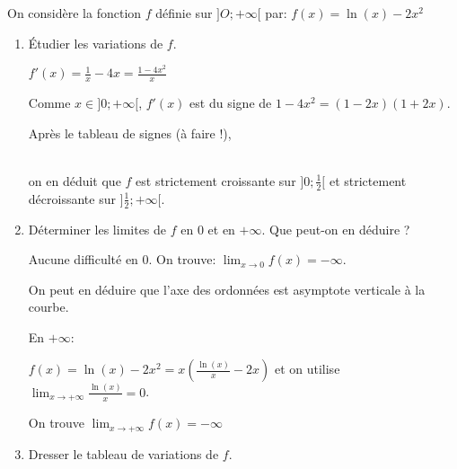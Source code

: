 \documentclass{cornouaille}
\begin{document}
\begin{exercice}[Logarithmes][7]
On considère la fonction $f$ définie sur $]O;+\infty[$ par: $f(x) = \ln(x)-2x^2$
\begin{enumerate}
	\item \'Etudier les variations de $f$.\\
	\ldotcarreaux[5]
\begin{solution}
$f'(x)=\frac{1}{x}-4x=\frac{1-4x^2}{x}$

Comme $x \in ]0;+\infty[$, $f'(x)$ est du signe de $1-4x^2=(1-2x)(1+2x)$.

Après le tableau de signes (à faire !),\\
 \\
on en déduit que $f$ est strictement croissante sur $]0;\frac{1}{2}[$ et strictement décroissante sur $]\frac{1}{2};+\infty[$.
\end{solution}
	\item Déterminer les limites de $f$ en 0 et en $+\infty$. Que peut-on en déduire ?\\
	\ldotcarreaux[6]
\begin{solution}
Aucune difficulté en 0. On trouve: $\lim_{x\to 0}f(x)=-\infty$.

On peut en déduire que l'axe des ordonnées est asymptote verticale à la courbe.

En $+\infty$:

$f(x)=\ln(x) - 2x^2 = x\left(\frac{\ln(x)}{x} -2x\right)$ et on utilise $\lim_{x\to +\infty} \frac{\ln(x)}{x} =0$.

On trouve $\lim_{x\to +\infty}f(x)=-\infty$
\end{solution}
	\item Dresser le tableau de variations de $f$.\\
	\ldotcarreaux[3]
	

\end{enumerate}
\end{exercice}
\end{document}
